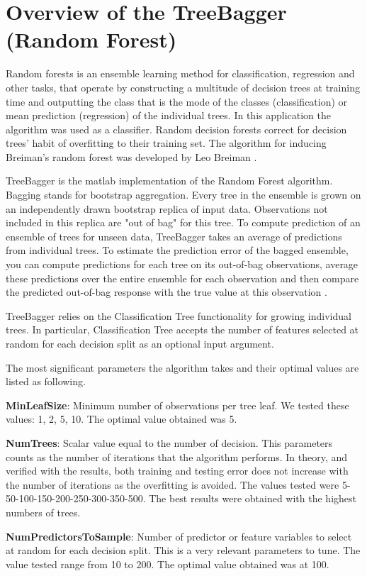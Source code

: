 \chapter{Overview of the TreeBagger (Random Forest)}
\label{ch:ch2label}
Random forests is an ensemble learning method for classification, regression and other tasks, that operate by constructing a multitude of decision trees at training time and outputting the class that is the mode of the classes (classification) or mean prediction (regression) of the individual trees. In this application the algorithm was used as a classifier. Random decision forests correct for decision trees' habit of overfitting to their training set. The algorithm for inducing Breiman's random forest was developed by Leo Breiman \citep{breiman2001random}.
 
TreeBagger is the matlab implementation of the Random Forest algorithm. 
Bagging stands for bootstrap aggregation. Every tree in the ensemble is grown on an independently drawn bootstrap replica of input data. Observations not included in this replica are "out of bag" for this tree. To compute prediction of an ensemble of trees for unseen data, TreeBagger takes an average of predictions from individual trees. To estimate the prediction error of the bagged ensemble, you can compute predictions for each tree on its out-of-bag observations, average these predictions over the entire ensemble for each observation and then compare the predicted out-of-bag response with the true value at this observation \citep{treebagger}.

TreeBagger relies on the Classification Tree functionality for growing individual trees. In particular, Classification Tree accepts the number of features selected at random for each decision split as an optional input argument.

The most significant parameters the algorithm takes and their optimal values are listed as following. 

\textbf{MinLeafSize}: Minimum number of observations per tree leaf. We tested these values: 1, 2, 5, 10. The optimal value obtained was 5.

\textbf{NumTrees}: Scalar value equal to the number of decision. This parameters counts as the number of iterations that the algorithm performs. In theory, and verified with the results, both training and testing error does not increase with the number of iterations as the overfitting is avoided. The values tested were 5-50-100-150-200-250-300-350-500. The best results were obtained with the highest numbers of trees.

\textbf{NumPredictorsToSample}: Number of predictor or feature variables to select at random for each decision split. This is a very relevant parameters to tune. The value tested range from 10 to 200. The optimal value obtained was at 100.
